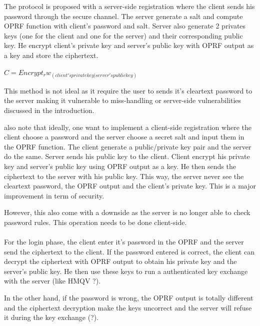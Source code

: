 \documentclass[../report.tex]{subfiles}
\begin{document}
The protocol is proposed with a server-side registration where the client sends his password through the secure channel. The server generate a salt and compute OPRF function with client's password and salt. Server also generate 2 privates keys (one for the client and one for the server) and their corresponding public key. He encrypt client's private key and server's public key with OPRF output as a key and store the ciphertext.


$C = Encrypt_rw_(client's private key | server's public key)$


This method is not ideal as it require the user to sends it's cleartext password to the server making it vulnerable to miss-handling or server-side vulnerabilities discussed in the introduction.



\cite{OPAQUE_Paper} also note that ideally, one want to implement a client-side registration where the client choose a password and the server choose a secret salt and input them in the OPRF function. The client generate a public/private key pair and the server do the same. Server sends his public key to the client. Client encrypt his private key and server's public key using OPRF output as a key. He then sends the ciphertext to the server with his public key.
This way, the server never see the cleartext password, the OPRF output and the client's private key. This is a major improvement in term of security.

However, this also come with a downside as the server is no longer able to check password rules. This operation needs to be done client-side.


\paragraph{}
For the login phase, the client enter it's password in the OPRF and the server send the ciphertext to the client.
If the password entered is correct, the client can decrypt the ciphertext with OPRF output to obtain his private key and the server's public key.
He then use these keys to run a authenticated key exchange with the server (like HMQV ?).

In the other hand, if the password is wrong, the OPRF output is totally different and the ciphertext decryption make the keys uncorrect and the server will refuse it during the key exchange (?). %



\end{document}
